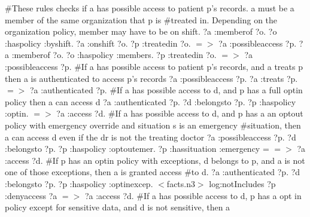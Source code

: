 \documentclass[conference]{IEEEtran}
\begin{document}
\#These rules checks if a has possible access to patient p's records. a must be a member of the same organization that p is \newline
\#treated in. Depending on the organization policy, member may have to be on shift. \newline 
\newline
{?a :memberof ?o. ?o :haspolicy :byshift. ?a :onshift ?o. ?p :treatedin ?o.} $=>$ {?a :possibleaccess ?p}.\newline 
\newline
{?a :memberof ?o. ?o :haspolicy :members. ?p :treatedin ?o.}  $=>$ {?a :possibleaccess ?p}.\newline
\newline
\#If a has possible access to patient p's records, and a treats p then a is authenticated to access p's records \newline
\newline
{?a :possibleaccess ?p. ?a :treats ?p.}  $=>$ {?a :authenticated ?p}.\newline 
\newline
\#If a has possible access to d, and p has a full optin policy then a can access d \newline
\newline
{?a :authenticated ?p. ?d :belongsto ?p. ?p :haspolicy :optin. }  $=>$ {?a :access ?d}.\newline
\newline
\#If a has possible access to d, and p has a an optout policy with emergency override and situation s is an emergency \newline
\#situation, then a can access d even if the dr is not the treating doctor \newline
\newline
{?a :possibleaccess ?p. ?d :belongsto ?p. ?p :haspolicy :optoutemer. ?p :hassituation :emergency} = $=>$ {?a :access ?d}. \newline
\newline
\#If p has an optin policy with exceptions, d belongs to p, and a is not one of those exceptions, then a is granted access\newline
\#to d. \newline
\newline
{?a :authenticated ?p. ?d :belongsto ?p. ?p :haspolicy :optinexcep. $<$facts.n3$>$ log:notIncludes {?p :denyaccess ?a}}  $=>$ {?a :access ?d}. \newline
\newline
\#If a has possible access to d, p has a opt in policy except for sensitive data, and d is not sensitive, then a \newline
\end{document}
